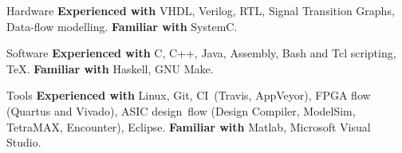 
\begin{cvskills}

\cvskill
{Hardware}
{\textbf{Experienced with} VHDL, Verilog, RTL, Signal Transition Graphs, 
Data-flow modelling. \textbf{Familiar with} SystemC.}

\cvskill
{Software}
{\textbf{Experienced with} C, C++, Java, Assembly, Bash and Tcl scripting, TeX. 
\textbf{Familiar with} Haskell, GNU Make.}

\cvskill
{Tools}
{\textbf{Experienced with} Linux, Git, CI~(Travis, AppVeyor), FPGA 
flow (Quartus and Vivado), ASIC design~flow (Design Compiler, ModelSim, 
TetraMAX, Encounter), Eclipse. \textbf{Familiar with} Matlab, 
Microsoft Visual 
Studio.}

\end{cvskills}
\vspace{-1mm}

